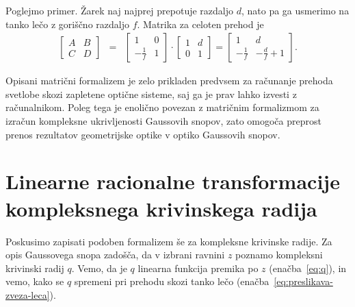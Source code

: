 Poglejmo primer. Žarek naj najprej prepotuje razdaljo $d$, nato pa ga usmerimo
na tanko lečo z goriščno razdaljo $f$. Matrika za celoten prehod je
\begin{eqnarray}
\left[\begin{array}{cc}
A & B\\
C & D
\end{array}\right] & = & \left[\begin{array}{cc}
1 & 0\\
-\frac{1}{f} & 1
\end{array}\right]\cdot\left[\begin{array}{cc}
1 & d\\
0 & 1
\end{array}\right] =  \left[\begin{array}{cc}
1 & d\\
-\frac{1}{f} & -\frac{d}{f}+1
\end{array}\right].
\label{eq:Mdf}
\end{eqnarray}
\begin{remark}
Opisani matrični formalizem je zelo prikladen predvsem za računanje prehoda
svetlobe skozi zapletene optične sisteme, saj ga je prav lahko izvesti z računalnikom. Poleg
tega je enolično povezan z matričnim formalizmom za izračun
kompleksne ukrivljenosti Gaussovih snopov, zato omogoča preprost prenos 
rezultatov geometrijske optike v optiko Gaussovih snopov.
\end{remark}

\section{Linearne racionalne transformacije kompleksnega krivinskega radija}

Poskusimo zapisati podoben formalizem še za kompleksne krivinske
radije. Za opis Gaussovega snopa zadošča, da v izbrani ravnini $z$ poznamo kompleksni
krivinski radij $q$. Vemo, da je $q$ linearna funkcija
premika po $z$ (enačba~\ref{eq:q}), in vemo, kako se $q$ 
spremeni pri prehodu skozi tanko lečo (enačba~\ref{eq:preslikava-zveza-leca}). 


